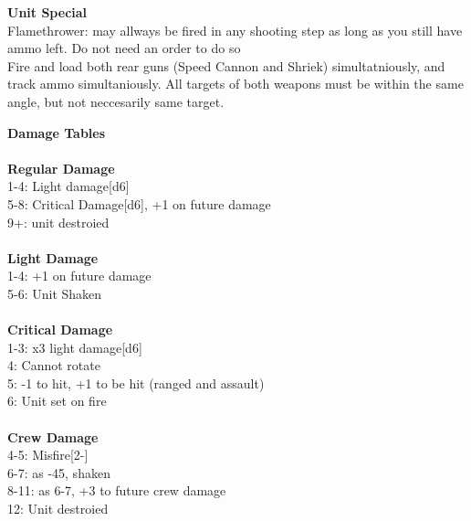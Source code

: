 {\bf Unit Special} \\
Flamethrower: may allways be fired in any shooting step as long as you still have ammo left. Do not need an order to do so \\ Fire and load both rear guns (Speed Cannon and Shriek) simultatniously, and track ammo simultaniously. All targets of both weapons must be within the same angle, but not neccesarily same target.

{\bf Damage Tables} \\
\ \\ {\bf Regular Damage } \\
1-4: Light damage[d6] \\
5-8: Critical Damage[d6], +1 on future damage \\
9+: unit destroied \\
\ \\ {\bf Light Damage } \\
1-4: +1 on future damage \\
5-6: Unit Shaken \\
\ \\ {\bf Critical Damage  } \\
1-3: x3 light damage[d6] \\
4: Cannot rotate \\
5: -1 to hit, +1 to be hit (ranged and assault) \\
6: Unit set on fire \\
\ \\ {\bf Crew Damage } \\
4-5: Misfire[2-] \\
6-7: as -45, shaken \\
8-11: as 6-7, +3 to future crew damage \\
12: Unit destroied \\










